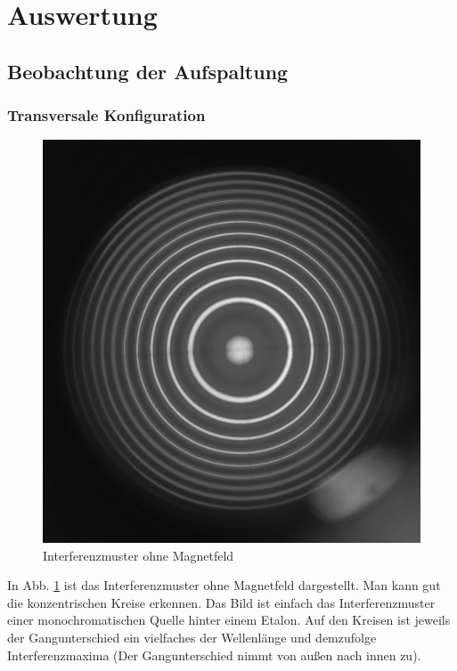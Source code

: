 \newpage

\section{Auswertung}
\subsection{Beobachtung der Aufspaltung}
\subsubsection{Transversale Konfiguration}
\begin{figure}
\centering
\includegraphics[scale=0.1]{data/bilder_okular/bild_1_edit.jpg}
\caption{Interferenzmuster ohne Magnetfeld}
\label{fig:bildtransohneB}
\end{figure}
In Abb. \ref{fig:bildtransohneB} ist das Interferenzmuster ohne Magnetfeld dargestellt. Man kann gut die konzentrischen Kreise erkennen. Das Bild ist einfach das Interferenzmuster einer monochromatischen Quelle hinter einem Etalon. Auf den Kreisen ist jeweils der Gangunterschied ein vielfaches der Wellenlänge und demzufolge Interferenzmaxima (Der Gangunterschied nimmt von außen nach innen zu).\\
